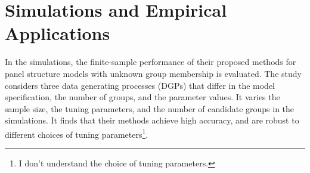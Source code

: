 \documentclass[UTF8,a4paper,10pt]{article}
\begin{document}








\section{Simulations and Empirical Applications}

In the simulations, the finite-sample performance of their proposed methods for panel structure models with unknown group membership is evaluated. The study considers three data generating processes (DGPs) that differ in the model specification, the number of groups, and the parameter values. It varies the sample size, the tuning parameters, and the number of candidate groups in the simulations. It finds that their methods achieve high accuracy, and are robust to different choices of tuning parameters\footnote{I don't understand the choice of tuning parameters.}.
\end{document}

